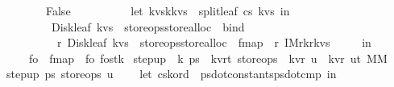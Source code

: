 \begin{isabellebody}
\ \ \ \ \ \ {\isacharbar}\ False\ {\isasymRightarrow}\ {\isacharparenleft}\isanewline
\ \ \ \ \ \ \ \ let\ {\isacharparenleft}kvs{}{\isacharcomma}k{\isacharprime}{\isacharcomma}kvs{}{\isacharparenright}\ {\isacharequal}\ split{\isacharunderscore}leaf\ cs\ kvs{\isacharprime}\ in\isanewline
\ \ \ \ \ \ \ \ Disk{\isacharunderscore}leaf\ kvs{}\ {\isacharbar}{\isachargreater}\ {\isacharparenleft}store{\isacharunderscore}ops{\isacharbar}{\isachargreater}store{\isacharunderscore}alloc{\isacharparenright}\ {\isacharbar}{\isachargreater}\ bind\isanewline
\ \ \ \ \ \ \ \ {\isacharparenleft}{\isacharpercent}\ r{}{\isachardot}\ Disk{\isacharunderscore}leaf\ kvs{}\ {\isacharbar}{\isachargreater}\ {\isacharparenleft}store{\isacharunderscore}ops{\isacharbar}{\isachargreater}store{\isacharunderscore}alloc{\isacharparenright}\ {\isacharbar}{\isachargreater}\ fmap\ {\isacharparenleft}{\isacharpercent}\ r{}{\isachardot}\ IM{}{\isacharparenleft}{\isacharparenleft}r{}{\isacharcomma}k{\isacharprime}{\isacharcomma}r{}{\isacharparenright}{\isacharcomma}kvs{}{\isacharprime}{\isacharparenright}{\isacharparenright}{\isacharparenright}{\isacharparenright}\ {\isacharparenright}\isanewline
\ \ \ \ in\isanewline
\ \ \ \ fo\ {\isacharbar}{\isachargreater}\ fmap\ {\isacharparenleft}{\isacharpercent}\ fo{\isachardot}\ {\isacharparenleft}fo{\isacharcomma}stk{\isacharparenright}{\isacharparenright}{\isacharparenright}{\isacharparenright}\isanewline
{\isacharparenright}{\isachardoublequoteclose}\isanewline
\isanewline
{}\isamarkupfalse%
\ step{\isacharunderscore}up\ {\isacharcolon}{\isacharcolon}\ {\isachardoublequoteopen}{\isacharprime}k\ ps{}\ {\isasymRightarrow}\ {\isacharparenleft}{\isacharprime}k{\isacharcomma}{\isacharprime}v{\isacharcomma}{\isacharprime}r{\isacharcomma}{\isacharprime}t{\isacharparenright}\ store{\isacharunderscore}ops\ {\isasymRightarrow}\ {\isacharparenleft}{\isacharprime}k{\isacharcomma}{\isacharprime}v{\isacharcomma}{\isacharprime}r{\isacharparenright}\ u\ {\isasymRightarrow}\ {\isacharparenleft}{\isacharparenleft}{\isacharprime}k{\isacharcomma}{\isacharprime}v{\isacharcomma}{\isacharprime}r{\isacharparenright}\ u{\isacharcomma}{\isacharprime}t{\isacharparenright}\ MM{\isachardoublequoteclose}\ \isanewline
{\isachardoublequoteopen}step{\isacharunderscore}up\ ps{}\ store{\isacharunderscore}ops\ u\ {\isacharequal}\ {\isacharparenleft}\isanewline
\ \ let\ {\isacharparenleft}cs{\isacharcomma}k{\isacharunderscore}ord{\isacharparenright}\ {\isacharequal}\ {\isacharparenleft}ps{}{\isacharbar}{\isachargreater}dot{\isacharunderscore}constants{\isacharcomma}ps{}{\isacharbar}{\isachargreater}dot{\isacharunderscore}cmp{\isacharparenright}\ in\isanewline

\end{isabellebody}
